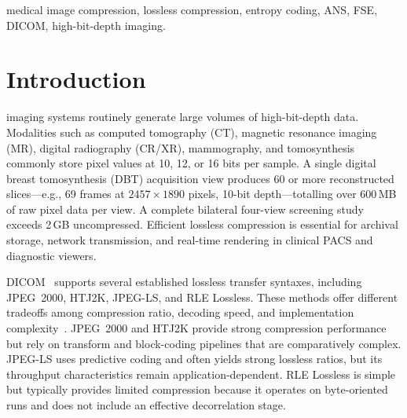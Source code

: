 \documentclass[journal]{IEEEtran}
\begin{document}
\begin{IEEEkeywords}
medical image compression, lossless compression, entropy coding, ANS, FSE,
DICOM, high-bit-depth imaging.
\end{IEEEkeywords}

\section{Introduction}
\label{sec:intro}

 imaging systems routinely generate large volumes of
high-bit-depth data. Modalities such as computed tomography (CT), magnetic
resonance imaging (MR), digital radiography (CR/XR), mammography, and
tomosynthesis commonly store pixel values at 10, 12, or 16 bits per sample. A
single digital breast tomosynthesis (DBT) acquisition view produces 60 or more
reconstructed slices---e.g., 69 frames at $2457 \times 1890$ pixels, 10-bit
depth---totalling over 600\,MB of raw pixel data per view. A complete bilateral
four-view screening study exceeds 2\,GB uncompressed. Efficient lossless
compression is essential for archival storage, network transmission, and
real-time rendering in clinical PACS and diagnostic viewers.

DICOM~\cite{dicom} supports several established lossless transfer syntaxes, including
JPEG~2000, HTJ2K, JPEG-LS, and RLE Lossless. These methods offer different
tradeoffs among compression ratio, decoding speed, and implementation
complexity~\cite{liu2017,clunie2000}. JPEG~2000 and HTJ2K provide strong compression performance but rely
on transform and block-coding pipelines that are comparatively complex. JPEG-LS
uses predictive coding and often yields strong lossless ratios, but its
throughput characteristics remain application-dependent. RLE Lossless is simple
but typically provides limited compression because it operates on byte-oriented
runs and does not include an effective decorrelation stage.
\end{document}
